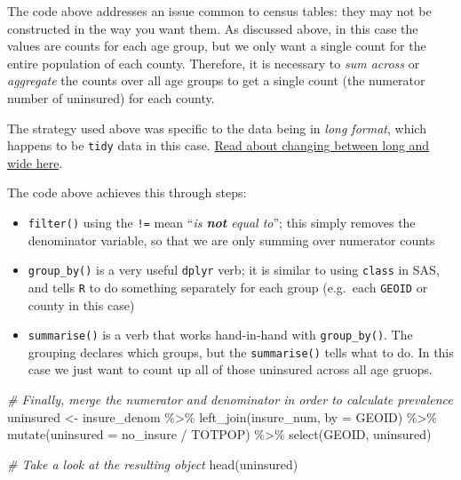 \documentclass[
]{book}
\newenvironment{Shaded}{\begin{snugshade}}{\end{snugshade}}
\newcommand{\AttributeTok}[1]{\textcolor[rgb]{0.77,0.63,0.00}{#1}}
\newcommand{\CommentTok}[1]{\textcolor[rgb]{0.56,0.35,0.01}{\textit{#1}}}
\newcommand{\FunctionTok}[1]{\textcolor[rgb]{0.00,0.00,0.00}{#1}}
\newcommand{\NormalTok}[1]{#1}
\newcommand{\OtherTok}[1]{\textcolor[rgb]{0.56,0.35,0.01}{#1}}
\newcommand{\SpecialCharTok}[1]{\textcolor[rgb]{0.00,0.00,0.00}{#1}}
\newcommand{\StringTok}[1]{\textcolor[rgb]{0.31,0.60,0.02}{#1}}
\providecommand{\tightlist}{%
  \setlength{\itemsep}{0pt}\setlength{\parskip}{0pt}}
\begin{document}
The code above addresses an issue common to census tables: they may not be constructed in the way you want them. As discussed above, in this case the values are counts for each age group, but we only want a single count for the entire population of each county. Therefore, it is necessary to \emph{sum across} or \emph{aggregate} the counts over all age groups to get a single count (the numerator number of uninsured) for each county.

The strategy used above was specific to the data being in \emph{long format}, which happens to be \texttt{tidy} data in this case. \protect\hyperlink{pivot_}{Read about changing between long and wide here}.

The code above achieves this through steps:

\begin{itemize}
\tightlist
\item
  \texttt{filter()} using the \texttt{!=} mean ``\emph{is \textbf{not} equal to}''; this simply removes the denominator variable, so that we are only summing over numerator counts
\item
  \texttt{group\_by()} is a very useful \texttt{dplyr} verb; it is similar to using \texttt{class} in SAS, and tells \texttt{R} to do something separately for each group (e.g.~each \texttt{GEOID} or county in this case)
\item
  \texttt{summarise()} is a verb that works hand-in-hand with \texttt{group\_by()}. The grouping declares which groups, but the \texttt{summarise()} tells what to do. In this case we just want to count up all of those uninsured across all age gruops.
\end{itemize}

\begin{Shaded}
\begin{Highlighting}[]
\CommentTok{\# Finally, merge the numerator and denominator in order to calculate prevalence}
\NormalTok{uninsured }\OtherTok{\textless{}{-}}\NormalTok{ insure\_denom }\SpecialCharTok{\%\textgreater{}\%}
  \FunctionTok{left\_join}\NormalTok{(insure\_num, }\AttributeTok{by =} \StringTok{\textquotesingle{}GEOID\textquotesingle{}}\NormalTok{) }\SpecialCharTok{\%\textgreater{}\%}
  \FunctionTok{mutate}\NormalTok{(}\AttributeTok{uninsured =}\NormalTok{ no\_insure }\SpecialCharTok{/}\NormalTok{ TOTPOP) }\SpecialCharTok{\%\textgreater{}\%}
  \FunctionTok{select}\NormalTok{(GEOID, uninsured)}

\CommentTok{\# Take a look at the resulting object}
\FunctionTok{head}\NormalTok{(uninsured)}
\end{Highlighting}
\end{Shaded}
\end{document}
